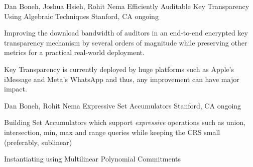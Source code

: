 
\begin{cventries}

  \cventry
    {Dan Boneh, Joshua Hsieh, Rohit Nema} %
    {Efficiently Auditable Key Transparency Using Algebraic Techniques} %
    {Stanford, CA} %
    {ongoing} %
    {
      \begin{cvitems} %
        \item Improving the download bandwidth of auditors in an end-to-end encrypted key transparency mechanism by several orders of magnitude while preserving other metrics for a practical real-world deployment.
        \item Key Transparency is currently deployed by huge platforms such as Apple's iMessage and Meta's WhatsApp and thus, any improvement can have major impact.
      \end{cvitems}
    }


\cventry
    {Dan Boneh, Rohit Nema} %
    {Expressive Set Accumulators} %
    {Stanford, CA} %
    {ongoing} %
    {
      \begin{cvitems} %
        \item{Building Set Accumulators which support \emph{expressive} operations such as union, intersection, min, max and range queries while keeping the CRS small (preferably, sublinear)}
        \item Instantiating using Multilinear Polynomial Commitments
      \end{cvitems}
    }

\end{cventries}
